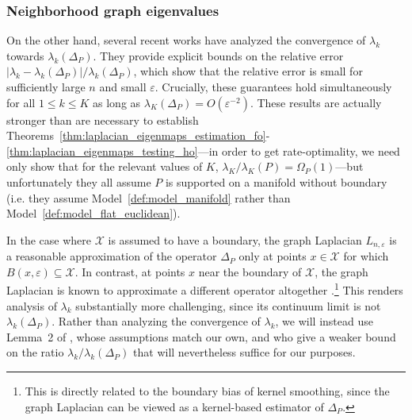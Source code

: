 \documentclass[aos]{imsart}
\theoremstyle{plain}
\theoremstyle{definition}
\theoremstyle{remark}
\newcommand{\mc}[1]{\mathcal{#1}}
\newcommand{\1}{\mathbf{1}}
\begin{document}
\subsubsection{Neighborhood graph eigenvalues}
On the other hand, several recent works \citep{burago2014,garciatrillos18,calder2019} have analyzed the convergence of $\lambda_{k}$ towards $\lambda_{k}(\Delta_P)$. They provide explicit bounds on the relative error $|\lambda_{k} - \lambda_{k}(\Delta_P)|/\lambda_{k}(\Delta_P)$, which show that the relative error is small for sufficiently large $n$ and small $\varepsilon$. Crucially, these guarantees hold simultaneously for all $1 \leq k \leq K$ as long as $\lambda_{K}(\Delta_P) = O(\varepsilon^{-2})$. These results are actually stronger than are necessary to establish Theorems~\ref{thm:laplacian_eigenmaps_estimation_fo}-\ref{thm:laplacian_eigenmaps_testing_ho}---in order to get rate-optimality, we need only show that for the relevant values of $K$, $\lambda_{K}/\lambda_K(P) = \Omega_P(1)$---but unfortunately they all assume $P$ is supported on a manifold without boundary (i.e. they assume Model~\ref{def:model_manifold} rather than Model~\ref{def:model_flat_euclidean}). 

In the case where $\mc{X}$ is assumed to have a boundary, the graph Laplacian $L_{n,\varepsilon}$ is a reasonable approximation of the operator $\Delta_P$ only at points $x \in \mc{X}$ for which $B(x,\varepsilon) \subseteq \mc{X}$. In contrast, at points $x$ near the boundary of $\mc{X}$, the graph Laplacian is known to approximate a different operator altogether \citep{belkin2012}.\footnote{This is directly related to the boundary bias of kernel smoothing, since the graph Laplacian can be viewed as a kernel-based estimator of $\Delta_P$.} This renders analysis of $\lambda_k$ substantially more challenging, since its continuum limit is not $\lambda_k(\Delta_P)$.  Rather than analyzing the convergence of $\lambda_k$, we will instead use Lemma~2 of \cite{green2021}, whose assumptions match our own, and who give a weaker bound on the ratio $\lambda_k/\lambda_k(\Delta_P)$ that will nevertheless suffice for our purposes. 
\end{document}
